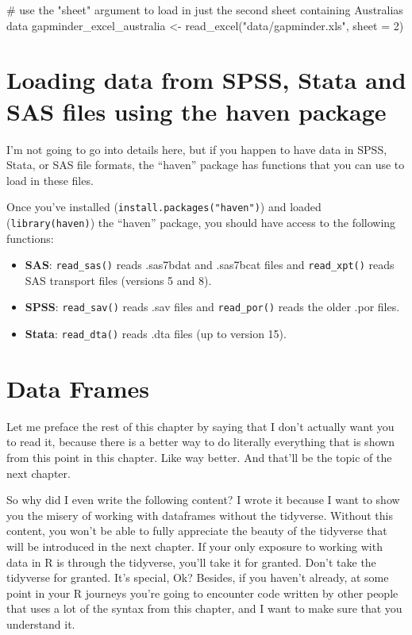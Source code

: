 \documentclass[
  letterpaper,
  DIV=11,
  numbers=noendperiod]{scrreprt}
\newenvironment{Shaded}{\begin{snugshade}}{\end{snugshade}}
\newcommand{\AttributeTok}[1]{\textcolor[rgb]{0.40,0.45,0.13}{#1}}
\newcommand{\CommentTok}[1]{\textcolor[rgb]{0.37,0.37,0.37}{#1}}
\newcommand{\DecValTok}[1]{\textcolor[rgb]{0.68,0.00,0.00}{#1}}
\newcommand{\FunctionTok}[1]{\textcolor[rgb]{0.28,0.35,0.67}{#1}}
\newcommand{\NormalTok}[1]{\textcolor[rgb]{0.00,0.23,0.31}{#1}}
\newcommand{\OtherTok}[1]{\textcolor[rgb]{0.00,0.23,0.31}{#1}}
\newcommand{\StringTok}[1]{\textcolor[rgb]{0.13,0.47,0.30}{#1}}
\begin{document}
\begin{Shaded}
\begin{Highlighting}[]
\CommentTok{\# use the "sheet" argument to load in just the second sheet containing Australia\textquotesingle{}s data}
\NormalTok{gapminder\_excel\_australia }\OtherTok{\textless{}{-}} \FunctionTok{read\_excel}\NormalTok{(}\StringTok{"data/gapminder.xls"}\NormalTok{, }\AttributeTok{sheet =} \DecValTok{2}\NormalTok{)}
\end{Highlighting}
\end{Shaded}

\section{Loading data from SPSS, Stata and SAS files using the haven
package}\label{loading-data-from-spss-stata-and-sas-files-using-the-haven-package}

I'm not going to go into details here, but if you happen to have data in
SPSS, Stata, or SAS file formats, the ``haven'' package has functions
that you can use to load in these files.

Once you've installed (\texttt{install.packages("haven")}) and loaded
(\texttt{library(haven)}) the ``haven'' package, you should have access
to the following functions:

\begin{itemize}
\item
  \textbf{SAS}: \texttt{read\_sas()} reads .sas7bdat and .sas7bcat files
  and \texttt{read\_xpt()} reads SAS transport files (versions 5 and 8).
\item
  \textbf{SPSS}: \texttt{read\_sav()} reads .sav files and
  \texttt{read\_por()} reads the older .por files.
\item
  \textbf{Stata}: \texttt{read\_dta()} reads .dta files (up to version
  15).
\end{itemize}

\section{Data Frames}\label{data-frames-1}

Let me preface the rest of this chapter by saying that I don't actually
want you to read it, because there is a better way to do literally
everything that is shown from this point in this chapter. Like way
better. And that'll be the topic of the next chapter.

So why did I even write the following content? I wrote it because I want
to show you the misery of working with dataframes without the tidyverse.
Without this content, you won't be able to fully appreciate the beauty
of the tidyverse that will be introduced in the next chapter. If your
only exposure to working with data in R is through the tidyverse, you'll
take it for granted. Don't take the tidyverse for granted. It's special,
Ok? Besides, if you haven't already, at some point in your R journeys
you're going to encounter code written by other people that uses a lot
of the syntax from this chapter, and I want to make sure that you
understand it.
\end{document}
